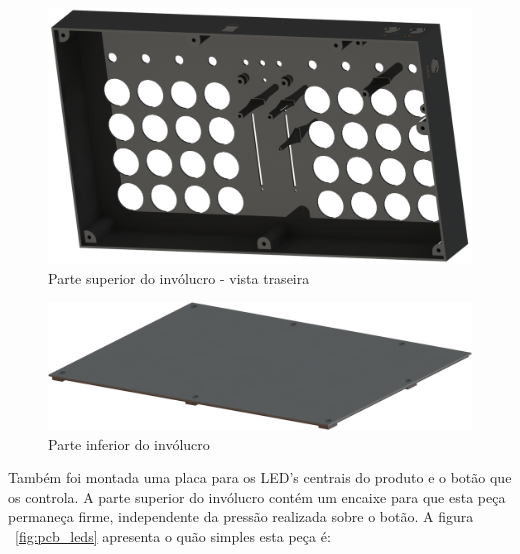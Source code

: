             \begin{figure}[H]
            	\centering
            	\includegraphics[scale=0.3]{Imagens/SW_Images/dalle_pad_capa_superior2.png}
            	\caption[Parte superior do invólucro - vista traseira]{Parte superior do invólucro - vista traseira}
            	\label{fig:top_dalle_pad_02}
            \end{figure}
            
            \begin{figure}[H]
            	\centering
            	\includegraphics[scale=0.3]{Imagens/SW_Images/dalle_pad_capa_inferior.png}
            	\caption[Parte inferior do invólucro]{Parte inferior do invólucro}
            	\label{fig:bottom_dalle_pad}
            \end{figure}
            
            Também foi montada uma placa para os LED's centrais do produto e o botão que os controla. A parte superior do invólucro contém um encaixe para que esta peça permaneça firme, independente da pressão realizada sobre o botão. A figura ~\ref{fig:pcb_leds} apresenta o quão simples esta peça é:
            
